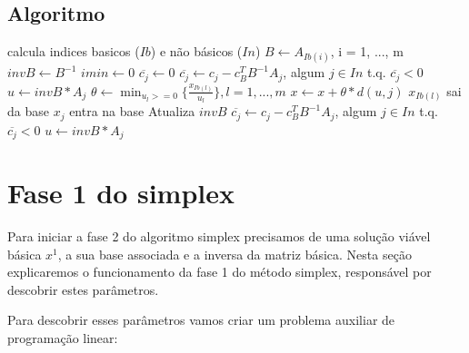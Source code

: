 \documentclass[12pt]{article}
\begin{document}
\subsection{Algoritmo}
\begin{algorithmic}
	\State calcula indices basicos ($Ib$) e não básicos ($In$)
    \State $B \gets  A_{Ib(i)}$, i = 1, ..., m
    \State $invB \gets B^{-1}$
   	\State $imin \gets 0$
        \State $\overline{c_{j}} \gets 0$
   	\Else
	\State $\overline{c_{j}} \gets c_{j} - c_{B}^{T}B^{-1}A_{j}$, algum $j \in In$ t.q. $\overline{c_{j}} < 0$
    \State $u \gets invB * A_{j}$  
    \EndIf 
        	\State {}
        \EndIf
    	\State $\theta \gets \min_{u_{l} >= 0} \{\frac{x_{Ib(l)}} {u_{l}}\}, l = 1, ... , m$
        \State $x \gets x + \theta * d(u, j)$
        \State $x_{Ib(l)}$ sai da base 
        \State $x_{j}$ entra na base 
        \State Atualiza $invB$
	    \State $\overline{c_{j}} \gets c_{j} - c_{B}^{T}B^{-1}A_{j}$, algum $j \in In$ t.q. $\overline{c_{j}} < 0$ 
        \State $u \gets invB * A_{j}$  
    \EndWhile
    \State {}
\EndFunction
\end{algorithmic}


\newpage
\section{Fase 1 do simplex}
	Para iniciar a fase 2 do algoritmo simplex precisamos de uma solução viável básica $x^1$, a sua base associada e a inversa da matriz básica. Nesta seção explicaremos o funcionamento da fase 1 do método simplex, responsável por descobrir estes parâmetros.

Para descobrir esses parâmetros vamos criar um problema auxiliar de programação linear:
\end{document}

